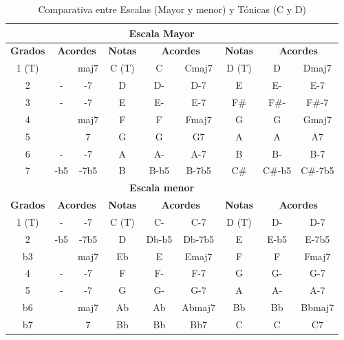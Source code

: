 \begin{table}[h]
    \centering
    \begin{tabular}{c|c|c||c|c|c||c|c|c}
        \multicolumn{3}{c}{} & \multicolumn{3}{c}{\textbf{Escala Mayor}}  \\
        \hline  
        \multicolumn{1}{c|}{\textbf{Grados}} & \multicolumn{2}{c||}{\textbf{Acordes}} & \multicolumn{1}{c|}{\textbf{Notas}} & \multicolumn{2}{c||}{\textbf{Acordes}} & \multicolumn{1}{c|}{\textbf{Notas}} & \multicolumn{2}{c}{\textbf{Acordes}} \\
           \hline
    1 (T) &     & maj7 & C (T) & C    & Cmaj7 & D (T)   & D      & Dmaj7   \\
        2 & -   & -7   &    D  & D-   & D-7   &    E    & E-     & E-7     \\
        3 & -   & -7   &    E  & E-   & E-7   &    F\#  & F\#-   & F\#-7   \\
        4 &     & maj7 &    F  & F    & Fmaj7 &    G    & G      & Gmaj7   \\
        5 &     & 7    &    G  & G    & G7    &    A    & A      & A7      \\
        6 & -   & -7   &    A  & A-   & A-7   &    B    & B-     & B-7     \\
        7 & -b5 & -7b5 &    B  & B-b5 & B-7b5 &    C\#  & C\#-b5 & C\#-7b5 \\
        \hline
        \multicolumn{3}{c}{} & \multicolumn{3}{c}{\textbf{Escala menor}}  \\
        \hline  
        \multicolumn{1}{c|}{\textbf{Grados}} & \multicolumn{2}{c||}{\textbf{Acordes}} & \multicolumn{1}{c|}{\textbf{Notas}} & \multicolumn{2}{c||}{\textbf{Acordes}} & \multicolumn{1}{c|}{\textbf{Notas}} & \multicolumn{2}{c}{\textbf{Acordes}} \\
           \hline 
    1 (T)  & -   & -7   & C (T)  & C-    & C-7    & D (T) & D-   & D-7    \\
        2  & -b5 & -7b5 &    D   & Db-b5 & Db-7b5 &    E  & E-b5 & E-7b5  \\
        b3 &     & maj7 &    Eb  & E     & Emaj7  &    F  & F    & Fmaj7  \\
        4  & -   & -7   &    F   & F-    & F-7    &    G  & G-   & G-7    \\
        5  & -   & -7   &    G   & G-    & G-7    &    A  & A-   & A-7    \\
        b6 &     & maj7 &    Ab  & Ab    & Abmaj7 &    Bb & Bb   & Bbmaj7 \\
        b7 &     & 7    &    Bb  & Bb    & Bb7    &    C  & C    & C7     \\

    \end{tabular}
    \caption{Comparativa entre Escalas (Mayor y menor) y Tónicas (C y D)}
    \label{tab:comparativa_scalas}
\end{table}
    

